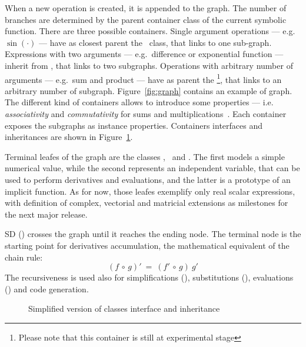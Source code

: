 When a new operation is created, it is appended to the graph. The number of branches are determined by the parent container class of the current symbolic function. There are three possible containers. Single argument operations --- e.g. $\sin(\cdot)$ --- have as closest parent the \CASOp~class, that links to one sub-graph. Expressions with two arguments --- e.g.\ difference or exponential function --- inherit from \CASBinaryOp, that links to two subgraphs. Operations with arbitrary number of arguments --- e.g.\ sum and product --- have as parent the \CASNaryOp\footnote{Please note that this container is still at experimental stage}, that links to an arbitrary number of subgraph. Figure~\ref{fig:graph} contains an example of graph. The different kind of containers allows to introduce some properties --- i.e. \emph{associativity} and \emph{commutativity} for sums and multiplications~\cite{cohen2003computer}. Each container exposes the subgraphs as instance properties. Containers interfaces and inheritances are shown in Figure~\ref{fig:uml-container}.

Terminal leafes of the graph are the classes \CASConstant, \CASVariable~and \CASFunction. The first models a simple numerical value, while the second represents an independent variable, that can be used to perform derivatives and evaluations, and the latter is a prototype of an implicit function. As for now, those leafes exemplify only real scalar expressions, with definition of complex, vectorial and matricial extensions as milestones for the next major release.

SD (\CASOpdiff) crosses the graph until it reaches the ending node. The terminal node is the starting point for derivatives accumulation, the mathematical equivalent of the chain rule:
\begin{equation}
\left( f  \, \circ \, g \right)' \: = \:
\left( f' \, \circ \, g \right) \: g'
\end{equation}
The recursiveness is used also for simplifications (\CASOpsimplify), substitutions (\CASOpsubs), evaluations (\CASOpcall) and code generation.

\begin{figure}[ht!]
\label{fig:uml-container}
\centering

\caption{Simplified version of classes interface and inheritance}
\end{figure}

